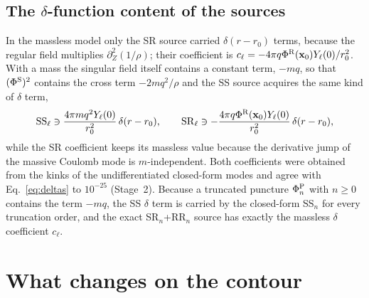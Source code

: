\documentclass[11pt,a4paper]{article}
\newcommand{\x}{\mathbf{x}}
\newcommand{\PhiP}{\Phi^{\rm P}}
\newcommand{\PhiR}{\Phi^{\rm R}}
\begin{document}
\subsection{The $\delta$-function content of the sources}\label{sec:delta}
In the massless model only the SR source carried $\delta(r-r_0)$ terms, because the regular field multiplies $\partial_Z^2(1/\rho)$; their coefficient is $c_\ell=-4\pi q\PhiR(\x_0)Y_\ell(0)/r_0^2$.
With a mass the singular field itself contains a constant term, $-mq$, so that $(\Phi^{\rm S})^2$ contains the cross term $-2mq^2/\rho$ and the SS source acquires the same kind of $\delta$ term,
\begin{equation}
{\rm SS}_\ell\ni\frac{4\pi mq^2Y_\ell(0)}{r_0^2}\,\delta(r-r_0),\qquad
{\rm SR}_\ell\ni-\frac{4\pi q\PhiR(\x_0)Y_\ell(0)}{r_0^2}\,\delta(r-r_0),
\label{eq:deltas}
\end{equation}
while the SR coefficient keeps its massless value because the derivative jump of the massive Coulomb mode is $m$-independent.
Both coefficients were obtained from the kinks of the undifferentiated closed-form modes and agree with Eq.~\eqref{eq:deltas} to $10^{-25}$ (Stage~2).
Because a truncated puncture $\PhiP_n$ with $n\ge0$ contains the term $-mq$, the SS $\delta$ term is carried by the closed-form SS$_n$ for every truncation order, and the exact SR$_n$+RR$_n$ source has exactly the massless $\delta$ coefficient $c_\ell$.

\section{What changes on the contour}\label{sec:changes}
\end{document}
